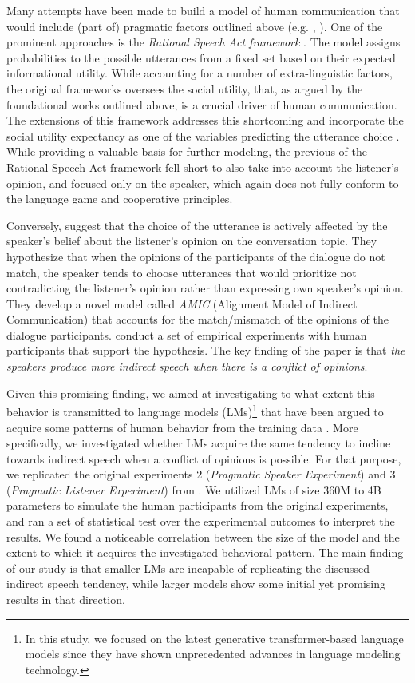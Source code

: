 \documentclass[11pt]{article}
\begin{document}
Many attempts have been made to build a model of human communication that would include (part of) pragmatic factors outlined above (e.g. \citealt{achimova-2022}, \citealt{goodman-2013}). One of the prominent approaches is the \textit{Rational Speech Act framework} \citep{goodman-2012}. The model assigns probabilities to the possible utterances from a fixed set based on their expected informational utility. While accounting for a number of extra-linguistic factors, the original frameworks oversees the social utility, that, as argued by the foundational works outlined above, is a crucial driver of human communication. The extensions of this framework addresses this shortcoming and incorporate the social utility expectancy as one of the variables predicting the utterance choice \citep{carcassi-2023}. While providing a valuable basis for further modeling, the previous of the Rational Speech Act framework fell short to also take into account the listener's opinion, and focused only on the speaker, which again does not fully conform to the language game and cooperative principles.

Conversely, \citet{achimova-2025} suggest that the choice of the utterance is actively affected by the speaker’s belief about the listener’s opinion on the conversation topic. They hypothesize that when the opinions of the participants of the dialogue do not match, the speaker tends to choose utterances that would prioritize not contradicting the listener's opinion rather than expressing own speaker's opinion. They develop a novel model called \textit{AMIC} (Alignment Model of Indirect Communication) that accounts for the match/mismatch of the opinions of the dialogue participants. \citet{achimova-2025} conduct a set of empirical experiments with human participants that support the hypothesis. The key finding of the paper is that \textit{the speakers produce more indirect speech when there is a conflict of opinions}.

Given this promising finding, we aimed at investigating to what extent this behavior is transmitted to language models (LMs)\footnote{In this study, we focused on the latest generative transformer-based language models since they have shown unprecedented advances in language modeling technology.} that have been argued to acquire some patterns of human behavior from the training data \citep{hashemi-2025}. More specifically, we investigated whether LMs acquire the same tendency to incline towards indirect speech when a conflict of opinions is possible. For that purpose, we replicated the original experiments 2 (\textit{Pragmatic Speaker Experiment}) and 3 (\textit{Pragmatic Listener Experiment}) from \citet{achimova-2025}. We utilized LMs of size 360M to 4B parameters to simulate the human participants from the original experiments, and ran a set of statistical test over the experimental outcomes to interpret the results. We found a noticeable correlation between the size of the model and the extent to which it acquires the investigated behavioral pattern. The main finding of our study is that smaller LMs are incapable of replicating the discussed indirect speech tendency, while larger models show some initial yet promising results in that direction.
\end{document}
